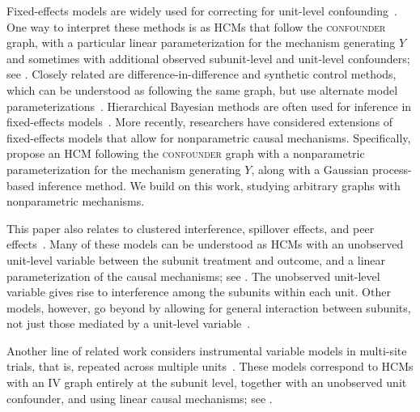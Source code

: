 \documentclass[12pt]{article}
\begin{document}
Fixed-effects models are widely used for correcting for unit-level
confounding~\citep[Chapters
10-11]{Wooldridge2005-bk,Wooldridge2010-dv}. One way to interpret
these methods is as HCMs that follow the \textsc{confounder} graph,
with a particular linear parameterization for the mechanism generating
$Y$ and sometimes with additional observed subunit-level and
unit-level confounders; see . Closely related
are difference-in-difference and synthetic control methods, which can
be understood as following the same graph, but use alternate model
parameterizations~\citep[Chapter 5][]{Angrist1999-hm, Abadie2010-nn}. 
Hierarchical Bayesian methods are often used for inference in fixed-effects models~\citep{Gelman2006-ft,Hill2013-jq,Feller2015-eb}. More recently,
researchers have considered extensions of fixed-effects models that allow for nonparametric causal mechanisms. Specifically,
\citet{Witty2020-et} propose an HCM
following the \textsc{confounder} graph with a nonparametric parameterization for the mechanism generating $Y$, along with a Gaussian process-based
inference method.
We build on this work, studying arbitrary graphs with nonparametric mechanisms.









This paper also relates to clustered interference, spillover effects,
and peer effects~\citep[Chapter
11]{Hudgens2008-hn,Tchetgen_Tchetgen2012-lm,Wooldridge2005-bk,Wooldridge2010-dv}.
Many of these models can be understood as HCMs with an unobserved
unit-level variable between the subunit treatment and outcome, and a linear
parameterization of the causal mechanisms; see . 
The unobserved unit-level variable gives rise to interference among the subunits within each unit.
Other models, however, go beyond by allowing for general
interaction between
subunits, not just those mediated by a unit-level variable~\citep{Hudgens2008-hn,Ogburn2014-rp,Savje2021-zy}.





Another line of related work considers instrumental variable models in
multi-site trials, that is, repeated across multiple
units~\citep{Raudenbush2012-es,Reardon2014-fy}. These models
correspond to HCMs with an IV graph entirely at the subunit level,
together with an unobserved unit confounder, and using linear causal mechanisms; see
. 
\end{document}
